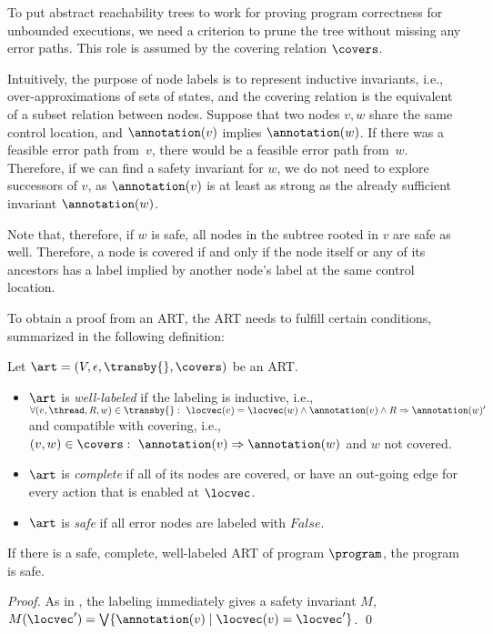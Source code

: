 \documentclass[conference]{IEEEtran}
\begin{document}
To put abstract reachability trees to work for proving program correctness
for unbounded executions, we need a criterion to prune the tree 
without missing any error paths.
This role is assumed by the covering relation $\covers$.

Intuitively, the purpose of node labels is to represent inductive invariants, i.e.,
over-approximations of sets of states, and the covering relation is the
equivalent of a subset relation between nodes.  Suppose that two nodes $v,w$
share the same control location, and $\annotation(v)$ implies
$\annotation(w)$.  If there was a feasible error path from~$v$, there would
be a feasible error path from~$w$.  Therefore, if we can find a safety
invariant for $w$, we do not need to explore successors of $v$, as
$\annotation(v)$ is at least as strong as the already sufficient invariant $\annotation(w)$.

Note that, therefore, if $w$ is safe, all nodes in the subtree rooted
in $v$ are safe as well.  Therefore, a node is covered if and only if the
node itself or any of its ancestors has a label implied by another node's
label at the same control location.

To obtain a proof from an ART, the ART needs to fulfill
certain conditions, summarized
in the following definition:

\begin{center}
  \begin{define}
    Let $\art=(V,\epsilon,\transby{},\covers)$ be an ART.
    \begin{itemize}
    \item $\art$ is \emph{well-labeled} if the labeling is
          inductive, i.e., 
          $\forall (v,\thread,R,w) \in \transby {}:\ \locvec(v) = \locvec(w) \wedge \annotation(v) \wedge R 
           \Rightarrow \annotation(w)'$
          and compatible with covering, i.e., 
          $(v,w)\in\covers:\ \annotation(v)\Rightarrow \annotation(w)$ and
          $w$ not covered.
    \item $\art$ is \emph{complete} if all of its nodes are covered,
    or have an out-going edge for every action that is enabled at $\locvec$.
    \item $\art$ is \emph{safe} if all error nodes are labeled with
    $\mathit{False}$.
    \end{itemize}
  \end{define}
\end{center}

\begin{theorem}
  If there is a safe, complete, well-labeled ART of program $\program$, the program is safe.
\end{theorem}
\begin{proof} 
  As in \cite{DBLP:conf/cav/McMillan06},
  the labeling immediately gives a safety invariant $M$,
  $M(\locvec') = \bigvee \{ \annotation(v) \mid \locvec(v) = \locvec'\}$. 
  \qed
\end{proof}
\end{document}
